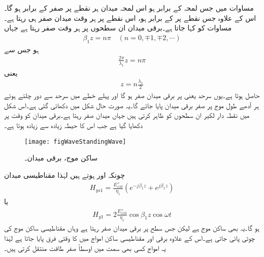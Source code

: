 مساوات  میں جس لمحہ  کے برابر ہو اس لمحہ میدان ہر نقطے پر صفر کے برابر ہو گا۔اس کے علاوہ جس نقطے پر   کے برابر ہو، اس نقطے پر ہر وقت میدان صفر ہی رہتا ہے۔مساوات  کو  کہا جاتا ہے۔برقی میدان ان سطحوں پر ہر وقت صفر رہتا ہے جہاں
\begin{align*}
\beta_1 z = n\pi \quad (n=0,\mp 1, \mp 2, \cdots)
\end{align*}
ہو جس سے
\begin{align*}
\frac{2\pi}{\lambda_1} z =n \pi
\end{align*}
یعنی
\begin{align*}
z=n\frac{\lambda_1}{2}
\end{align*}
حاصل ہوتا ہے۔یوں سرحد یعنی  پر برقی میدان صفر ہو گا اور پہلے خطے میں سرحد سے دور چلتے ہوئے ہر آدھے  طول موج پر صفر برقی میدان پایا جائے گا۔یہ صورت حال شکل  میں دکھائی گئی ہے۔اس شکل میں نقطہ دار لکیر ان سطحوں کو ظاہر کرتی ہیں جہاں میدان صفر رہتا ہے۔برقی میدان کو وقت  پر دکھایا گیا ہے جب اس کا حیطہ زیادہ سے زیادہ ہوتا ہے۔ 

\begin{figure}
\centering
\texttt{[image: figWaveStandingWave]}
\caption{ساکن موج، برقی میدان۔}
\label{شکل_موج_ساکن_برقی_موج}
\end{figure}

چونکہ  اور  ہوتے ہیں لہٰذا مقناطیسی میدان
\begin{align*}
H_{ys1}=\frac{E_{x10}^+}{\eta_1} \left(e^{-j\beta_1 z}+e^{j \beta_1 z} \right)
\end{align*}
یا
\begin{align}
H_{y1}=2 \frac{E_{x10}^+}{\eta_1} \cos \beta_1 z \cos \omega t
\end{align}
ہو گا۔یہ بھی ساکن موج ہے لیکن  جس سطح پر  برقی میدان صفر رہتا ہے وہاں مقناطیسی ساکن موج کی چوٹی پائی جاتی ہے۔اس کے علاوہ برقی اور مقناطیسی ساکن امواج میں  کا وقتی فرق پایا جاتا ہے لہٰذا یہ امواج کسی بھی سمت میں اوسطاً صفر طاقت منتقل کرتی ہیں۔

